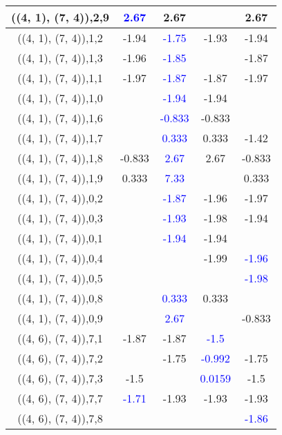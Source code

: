\documentclass{article}
\begin{document}
\begin{center}
\begin{longtable}{|c|c|c|c|c|}
        	\hline
        	((4, 1), (7, 4)),2,9& \textcolor{blue}{2.67}&2.67&&2.67\\
        	\hline
        	((4, 1), (7, 4)),1,2&-1.94& \textcolor{blue}{-1.75}&-1.93&-1.94\\
        	\hline
        	((4, 1), (7, 4)),1,3&-1.96& \textcolor{blue}{-1.85}&&-1.87\\
        	\hline
        	((4, 1), (7, 4)),1,1&-1.97& \textcolor{blue}{-1.87}&-1.87&-1.97\\
        	\hline
        	((4, 1), (7, 4)),1,0&& \textcolor{blue}{-1.94}&-1.94&\\
        	\hline
        	((4, 1), (7, 4)),1,6&& \textcolor{blue}{-0.833}&-0.833&\\
        	\hline
        	((4, 1), (7, 4)),1,7&& \textcolor{blue}{0.333}&0.333&-1.42\\
        	\hline
        	((4, 1), (7, 4)),1,8&-0.833& \textcolor{blue}{2.67}&2.67&-0.833\\
        	\hline
        	((4, 1), (7, 4)),1,9&0.333& \textcolor{blue}{7.33}&&0.333\\
        	\hline
        	((4, 1), (7, 4)),0,2&& \textcolor{blue}{-1.87}&-1.96&-1.97\\
        	\hline
        	((4, 1), (7, 4)),0,3&& \textcolor{blue}{-1.93}&-1.98&-1.94\\
        	\hline
        	((4, 1), (7, 4)),0,1&& \textcolor{blue}{-1.94}&-1.94&\\
        	\hline
        	((4, 1), (7, 4)),0,4&&&-1.99& \textcolor{blue}{-1.96}\\
        	\hline
        	((4, 1), (7, 4)),0,5&&&& \textcolor{blue}{-1.98}\\
        	\hline
        	((4, 1), (7, 4)),0,8&& \textcolor{blue}{0.333}&0.333&\\
        	\hline
        	((4, 1), (7, 4)),0,9&& \textcolor{blue}{2.67}&&-0.833\\
        	\hline
        	((4, 6), (7, 4)),7,1&-1.87&-1.87& \textcolor{blue}{-1.5}&\\
        	\hline
        	((4, 6), (7, 4)),7,2&&-1.75& \textcolor{blue}{-0.992}&-1.75\\
        	\hline
        	((4, 6), (7, 4)),7,3&-1.5&& \textcolor{blue}{0.0159}&-1.5\\
        	\hline
        	((4, 6), (7, 4)),7,7& \textcolor{blue}{-1.71}&-1.93&-1.93&-1.93\\
        	\hline
        	((4, 6), (7, 4)),7,8&&&& \textcolor{blue}{-1.86}\\

\end{longtable}
\end{center}
\end{document}
